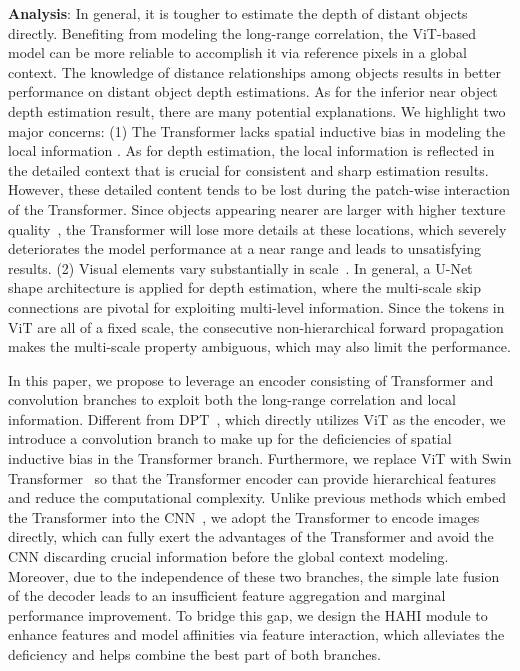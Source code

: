 \documentclass[twocolumn]{svjour3}    \pdfoutput=1
\begin{document}
\textbf{Analysis}: In general, it is tougher to estimate the depth of distant objects directly. Benefiting from modeling the long-range correlation, the ViT-based model can be more reliable to accomplish it via reference pixels in a global context. The knowledge of distance relationships among objects results in better performance on distant object depth estimations. As for the inferior near object depth estimation result, there are many potential explanations. We highlight two major concerns: (1) The Transformer lacks spatial inductive bias in modeling the local information \citep{yang2021transdepth}. As for depth estimation, the local information is reflected in the detailed context that is crucial for consistent and sharp estimation results. However, these detailed content tends to be lost during the patch-wise interaction of the Transformer. Since objects appearing nearer are larger with higher texture quality~\citep{saxena2005learning}, the Transformer will lose more details at these locations, which severely deteriorates the model performance at a near range and leads to unsatisfying results. (2) Visual elements vary substantially in scale~\citep{liu2021swin}. In general, a U-Net~\citep{ronneberger2015u} shape architecture is applied for depth estimation, where the multi-scale skip connections are pivotal for exploiting multi-level information. Since the tokens in ViT are all of a fixed scale, the consecutive non-hierarchical forward propagation makes the multi-scale property ambiguous, which may also limit the performance.

In this paper, we propose to leverage an encoder consisting of Transformer and convolution branches to exploit both the long-range correlation and local information. Different from DPT~\citep{ranftl2021dpt}, which directly utilizes ViT as the encoder, we introduce a convolution branch to make up for the deficiencies of spatial inductive bias in the Transformer branch. Furthermore, we replace ViT with Swin Transformer~\citep{liu2021swin} so that the Transformer encoder can provide hierarchical features and reduce the computational complexity. Unlike previous methods which embed the Transformer into the CNN~\citep{bhat2021adabins, yang2021transdepth}, we adopt the Transformer to encode images directly, which can fully exert the advantages of the Transformer and avoid the CNN discarding crucial information before the global context modeling. Moreover, due to the independence of these two branches, the simple late fusion of the decoder leads to an insufficient feature aggregation and marginal performance improvement. To bridge this gap, we design the HAHI module to enhance features and model affinities via feature interaction, which alleviates the deficiency and helps combine the best part of both branches.
\end{document}
